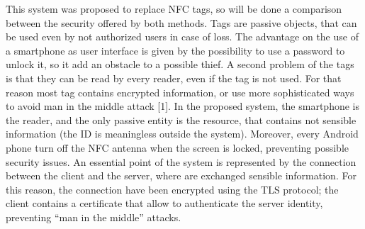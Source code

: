 \documentclass[conference]{IEEEtran}
\begin{document}
This system was proposed to replace NFC tags, so will be done a comparison between the security offered by both methods.
Tags are passive objects, that can be used even by not authorized users in case of loss. The advantage on the use of a smartphone as user interface is given by the possibility to use a password to unlock it, so it add an obstacle to a possible thief.
A second problem of the tags is that they can be read by every reader, even if the tag is not used. For that reason most tag contains encrypted information, or use more sophisticated ways to avoid man in the middle attack [1].
In the proposed system, the smartphone is the reader, and the only passive entity is the resource, that contains not sensible information (the ID is meaningless outside the system). Moreover, every Android phone turn off the NFC antenna when the screen is locked, preventing possible security issues.
An essential point of the system is represented by the connection between the client and the server, where are exchanged sensible information. For this reason, the connection have been encrypted using the TLS protocol; the client contains a certificate that allow to authenticate the server identity, preventing “man in the middle” attacks.


%
%

\end{document}
